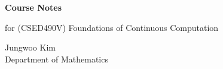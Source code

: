 \documentclass[11pt,oneside]{article}
\begin{document}
\thispagestyle{empty}
\begin{center}
  \vspace*{1.1cm}
  {\LARGE\bfseries Course Notes\par}
  \vspace{0.25cm}
  {\large for (CSED490V) Foundations of Continuous Computation\par}
  \vspace{0.75cm}
  {\normalsize Jungwoo Kim\\
   Department of Mathematics\\
   \PohangUniversityOfScienceAndTechnology\par}
\end{center}
\vspace{0.45cm}
\tableofcontents
\clearpage
{}









\end{document}
